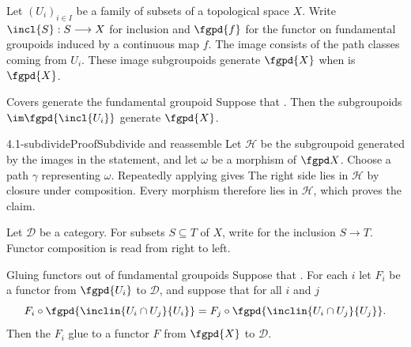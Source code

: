 Let $(U_i)_{i\in I}$ be a family of subsets of a topological space $X$.
Write $\incl{S}:S\longrightarrow X$ for inclusion and $\fgpd{f}$ for the
functor on fundamental groupoids induced by a continuous map $f$.
The image 
consists of the path classes coming from $U_i$.  These image subgroupoids
generate $\fgpd{X}$ when
 is $\fgpd{X}$.

\begin{theorem}[id=4.1]{Covers generate the fundamental groupoid}
Suppose that \hypCoverFamily.  Then the subgroupoids $\im \fgpd{\incl{U_{i}}}$
generate $\fgpd{X}$.
\end{theorem}

\begin{proofpassage}{4.1-subdivide}{Proof}{Subdivide and reassemble}
Let $\mathcal H$ be the subgroupoid generated by the images in the
statement, and let $\omega$ be a morphism of $\fgpd X$.  Choose a path
$\gamma$ representing $\omega$.  
  Repeatedly applying  gives
The right side lies in $\mathcal H$ by closure under composition.  Every
morphism therefore lies in $\mathcal H$, which proves the claim.
\end{proofpassage}

Let $\mathcal D$ be a category.  For subsets $S\subseteq T$ of $X$, write
 for the inclusion
$S\longrightarrow T$.  Functor composition
 is read from right to left.

\begin{definition}[id=4.2]{Gluing functors out of fundamental groupoids}
Suppose that \hypCoverFamily.  For each $i$ let $F_{i}$ be a functor from
$\fgpd{U_{i}}$ to $\mathcal{D}$, and suppose that for all $i$ and $j$
\[
  F_{i} \circ \fgpd{\inclin{U_{i} \cap U_{j}}{U_{i}}}
    = F_{j} \circ \fgpd{\inclin{U_{i} \cap U_{j}}{U_{j}}}.
\]
Then the $F_{i}$ glue to a functor $F$ from $\fgpd{X}$ to $\mathcal{D}$.
\end{definition}

